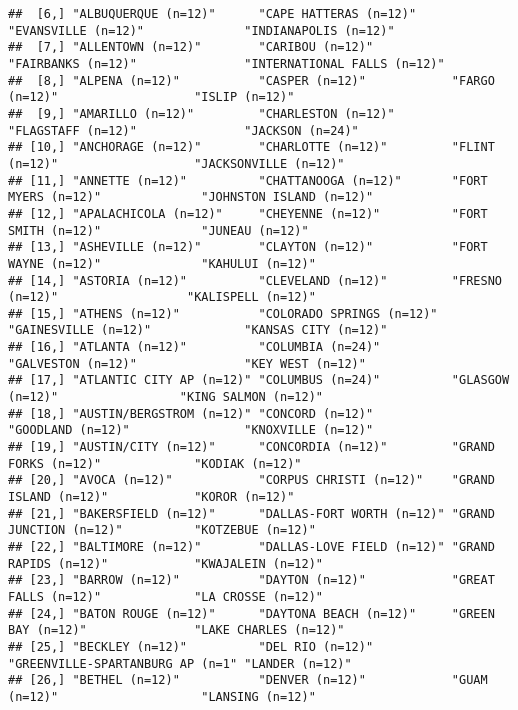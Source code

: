 \documentclass[
]{book}
\begin{document}
\begin{verbatim}
##  [6,] "ALBUQUERQUE (n=12)"      "CAPE HATTERAS (n=12)"     "EVANSVILLE (n=12)"              "INDIANAPOLIS (n=12)"       
##  [7,] "ALLENTOWN (n=12)"        "CARIBOU (n=12)"           "FAIRBANKS (n=12)"               "INTERNATIONAL FALLS (n=12)"
##  [8,] "ALPENA (n=12)"           "CASPER (n=12)"            "FARGO (n=12)"                   "ISLIP (n=12)"              
##  [9,] "AMARILLO (n=12)"         "CHARLESTON (n=12)"        "FLAGSTAFF (n=12)"               "JACKSON (n=24)"            
## [10,] "ANCHORAGE (n=12)"        "CHARLOTTE (n=12)"         "FLINT (n=12)"                   "JACKSONVILLE (n=12)"       
## [11,] "ANNETTE (n=12)"          "CHATTANOOGA (n=12)"       "FORT MYERS (n=12)"              "JOHNSTON ISLAND (n=12)"    
## [12,] "APALACHICOLA (n=12)"     "CHEYENNE (n=12)"          "FORT SMITH (n=12)"              "JUNEAU (n=12)"             
## [13,] "ASHEVILLE (n=12)"        "CLAYTON (n=12)"           "FORT WAYNE (n=12)"              "KAHULUI (n=12)"            
## [14,] "ASTORIA (n=12)"          "CLEVELAND (n=12)"         "FRESNO (n=12)"                  "KALISPELL (n=12)"          
## [15,] "ATHENS (n=12)"           "COLORADO SPRINGS (n=12)"  "GAINESVILLE (n=12)"             "KANSAS CITY (n=12)"        
## [16,] "ATLANTA (n=12)"          "COLUMBIA (n=24)"          "GALVESTON (n=12)"               "KEY WEST (n=12)"           
## [17,] "ATLANTIC CITY AP (n=12)" "COLUMBUS (n=24)"          "GLASGOW (n=12)"                 "KING SALMON (n=12)"        
## [18,] "AUSTIN/BERGSTROM (n=12)" "CONCORD (n=12)"           "GOODLAND (n=12)"                "KNOXVILLE (n=12)"          
## [19,] "AUSTIN/CITY (n=12)"      "CONCORDIA (n=12)"         "GRAND FORKS (n=12)"             "KODIAK (n=12)"             
## [20,] "AVOCA (n=12)"            "CORPUS CHRISTI (n=12)"    "GRAND ISLAND (n=12)"            "KOROR (n=12)"              
## [21,] "BAKERSFIELD (n=12)"      "DALLAS-FORT WORTH (n=12)" "GRAND JUNCTION (n=12)"          "KOTZEBUE (n=12)"           
## [22,] "BALTIMORE (n=12)"        "DALLAS-LOVE FIELD (n=12)" "GRAND RAPIDS (n=12)"            "KWAJALEIN (n=12)"          
## [23,] "BARROW (n=12)"           "DAYTON (n=12)"            "GREAT FALLS (n=12)"             "LA CROSSE (n=12)"          
## [24,] "BATON ROUGE (n=12)"      "DAYTONA BEACH (n=12)"     "GREEN BAY (n=12)"               "LAKE CHARLES (n=12)"       
## [25,] "BECKLEY (n=12)"          "DEL RIO (n=12)"           "GREENVILLE-SPARTANBURG AP (n=1" "LANDER (n=12)"             
## [26,] "BETHEL (n=12)"           "DENVER (n=12)"            "GUAM (n=12)"                    "LANSING (n=12)"            

\end{verbatim}
\end{document}
